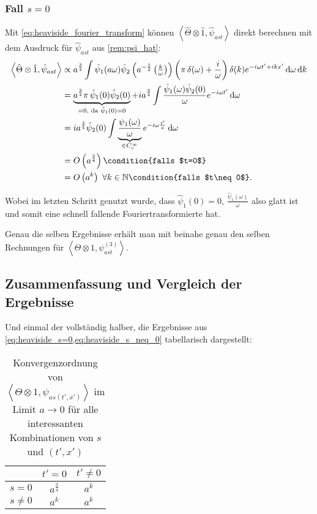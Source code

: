 \subsubsection*{Fall $s = 0$}
Mit \cref{eq:heaviside_fourier_transform} können $\left<\hat \Theta \otimes \hat 1, \hat \psi_{ast}\right>$ direkt berechnen mit dem Ausdruck für $\hat \psi_{ast}$ aus \cref{rem:psi_hat}:
\begin{align}
    \left\langle \hat\Theta \otimes \hat 1, \hat \psi_{ast} \right\rangle
    &\propto
    a^{\frac{3}{4}} \int \hat \psi_1(a \omega) \hat \psi_2\left(
                a^{-\frac{1}{2}}\left(\tfrac{k}{\omega}\right)\right)
    \left(\pi \,\delta(\omega) + \frac{i}{\omega}\right) \delta(k)
    e^{-i\omega t' + i kx'}
    \d \omega \d k
    \nonumber \\ &=
    \underbrace{a^{\frac{3}{4}} \pi\, \hat\psi_1(0) \hat\psi_2(0)
    }_{=0, \textrm{ da } \hat\psi_1(0) = 0}
    +
    i a^{\frac{3}{4}}
    \int \frac{\hat\psi_1(\omega) \hat\psi_2(0)}
        {\omega} e^{-i \omega t'} \d \omega
    \nonumber \\ &=
    i a^{\frac{3}{4}} \hat\psi_2(0) \int
    \underbrace{\frac{\psi_1(\omega)}{\omega}}_{\in C_c^\infty}
    e^{-i\omega\frac{t'}{a}} \d \omega
    \nonumber \\ &=
    O\left(a^{\frac{3}{4}}\right) \condition{falls $t=0$}
    \nonumber \\ &=
    O\left(a^{k}\right) ~ \forall k \in \mathbb{N} \condition{falls $t\neq0$}.
    \label{eq:heaviside_s=0}
\end{align}

Wobei im letzten Schritt genutzt wurde, dass $\hat\psi_1(0) = 0$, $\frac{\hat\psi_1(\omega)}{\omega}$ also glatt ist und somit eine schnell fallende Fouriertransformierte hat.

Genau die selben Ergebnisse erhält man mit beinahe genau den selben Rechnungen für $\left<\Theta \otimes 1, \psi_{ast}^{(3)}\right>$.

\subsection{Zusammenfassung und Vergleich der Ergebnisse}
Und einmal der vollständig halber, die Ergebnisse aus \cref{eq:heaviside_s=0,eq:heaviside_s_neq_0} tabellarisch dargestellt:
\begin{table}[h]
\centering
\begin{tabular}{l|cc}
           & \multicolumn{1}{l}{$t'=0$} & \multicolumn{1}{l}{$t' \neq 0$} \\ \hline
$s = 0$    & $a^{\frac{3}{4}}$          & $a^k$                           \\
$s \neq 0$ & $a^k$                      & $a^k$
\end{tabular}
\caption{Konvergenzordnung von $\left<\Theta \otimes 1,\psi_{as(t',x')}\right>$ im Limit $a \rightarrow 0$ für alle interessanten Kombinationen von $s$ und $(t',x')$}
\label{tab:wavefront_set_heaviside}
\end{table}



